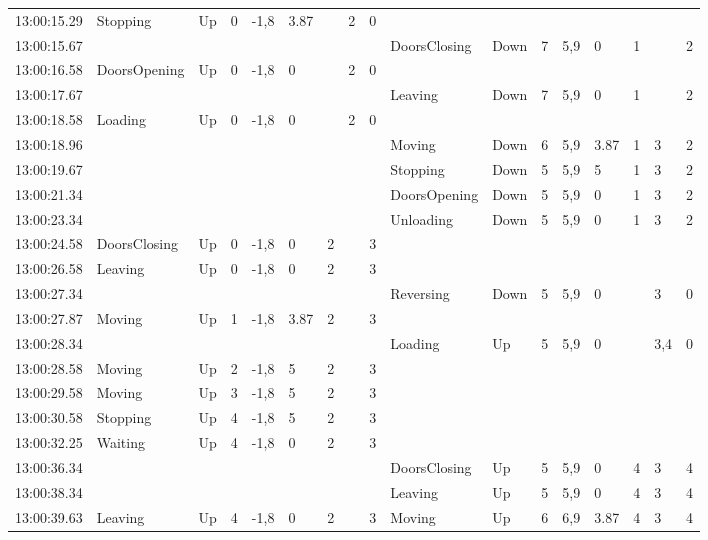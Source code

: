 \documentclass{UoYCSproject}
\begin{document}
\begin{landscape}
\begin{longtable}{l || l | l | l | l | l | l | l | l || l | l | l | l | l | l | l | l}
	13:00:15.29 & Stopping & Up & 0 & -1,8 & 3.87 &  & 2 & 0 &  &  &  &  &  &  &  &  \\
	13:00:15.67 &  &  &  &  &  &  &  &  & DoorsClosing & Down & 7 & 5,9 & 0 & 1 &  & 2 \\
	13:00:16.58 & DoorsOpening & Up & 0 & -1,8 & 0 &  & 2 & 0 &  &  &  &  &  &  &  &  \\
	13:00:17.67 &  &  &  &  &  &  &  &  & Leaving & Down & 7 & 5,9 & 0 & 1 &  & 2 \\
	13:00:18.58 & Loading & Up & 0 & -1,8 & 0 &  & 2 & 0 &  &  &  &  &  &  &  &  \\
	13:00:18.96 &  &  &  &  &  &  &  &  & Moving & Down & 6 & 5,9 & 3.87 & 1 & 3 & 2 \\
	13:00:19.67 &  &  &  &  &  &  &  &  & Stopping & Down & 5 & 5,9 & 5 & 1 & 3 & 2 \\
	13:00:21.34 &  &  &  &  &  &  &  &  & DoorsOpening & Down & 5 & 5,9 & 0 & 1 & 3 & 2 \\
	13:00:23.34 &  &  &  &  &  &  &  &  & Unloading & Down & 5 & 5,9 & 0 & 1 & 3 & 2 \\
	13:00:24.58 & DoorsClosing & Up & 0 & -1,8 & 0 & 2 &  & 3 &  &  &  &  &  &  &  &  \\
	13:00:26.58 & Leaving & Up & 0 & -1,8 & 0 & 2 &  & 3 &  &  &  &  &  &  &  &  \\
	13:00:27.34 &  &  &  &  &  &  &  &  & Reversing & Down & 5 & 5,9 & 0 &  & 3 & 0 \\
	13:00:27.87 & Moving & Up & 1 & -1,8 & 3.87 & 2 &  & 3 &  &  &  &  &  &  &  &  \\
	13:00:28.34 &  &  &  &  &  &  &  &  & Loading & Up & 5 & 5,9 & 0 &  & 3,4 & 0 \\
	13:00:28.58 & Moving & Up & 2 & -1,8 & 5 & 2 &  & 3 &  &  &  &  &  &  &  &  \\
	13:00:29.58 & Moving & Up & 3 & -1,8 & 5 & 2 &  & 3 &  &  &  &  &  &  &  &  \\
	13:00:30.58 & Stopping & Up & 4 & -1,8 & 5 & 2 &  & 3 &  &  &  &  &  &  &  &  \\
	13:00:32.25 & Waiting & Up & 4 & -1,8 & 0 & 2 &  & 3 &  &  &  &  &  &  &  &  \\
	13:00:36.34 &  &  &  &  &  &  &  &  & DoorsClosing & Up & 5 & 5,9 & 0 & 4 & 3 & 4 \\
	13:00:38.34 &  &  &  &  &  &  &  &  & Leaving & Up & 5 & 5,9 & 0 & 4 & 3 & 4 \\
	13:00:39.63 & Leaving & Up & 4 & -1,8 & 0 & 2 &  & 3 & Moving & Up & 6 & 6,9 & 3.87 & 4 & 3 & 4 \\

\end{longtable}
\end{landscape}
\end{document}
